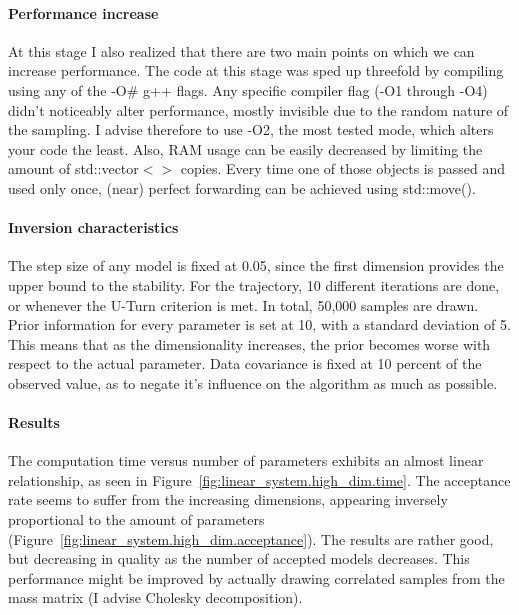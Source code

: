 \paragraph{Performance increase}At this stage I also realized that there are two main points on which we can increase performance. The code at this stage was sped up threefold by compiling using any of the -O\# g++ flags. Any specific compiler flag (-O1 through -O4) didn't noticeably alter performance, mostly invisible due to the random nature of the sampling. I advise therefore to use -O2, the most tested mode, which alters your code the least. Also, RAM usage can be easily decreased by limiting the amount of std::vector$<>$ copies. Every time one of those objects is passed and used only once, (near) perfect forwarding can be achieved using std::move().


\paragraph{Inversion characteristics}The step size of any model is fixed at 0.05, since the first dimension provides the upper bound to the stability. For the trajectory, 10 different iterations are done, or whenever the U-Turn criterion is met. In total, 50,000 samples are drawn. Prior information for every parameter is set at 10, with a standard deviation of 5. This means that as the dimensionality increases, the prior becomes worse with respect to the actual parameter. Data covariance is fixed at 10 percent of the observed value, as to negate it's influence on the algorithm as much as possible. 

\paragraph{Results}The computation time versus number of parameters exhibits an almost linear relationship, as seen in Figure~\ref{fig:linear_system.high_dim.time}. The acceptance rate seems to suffer from the increasing dimensions, appearing inversely proportional to the amount of parameters (Figure~\ref{fig:linear_system.high_dim.acceptance}). The results are rather good, but decreasing in quality as the number of accepted models decreases. This performance might be improved by actually drawing correlated samples from the mass matrix (I advise Cholesky decomposition).

